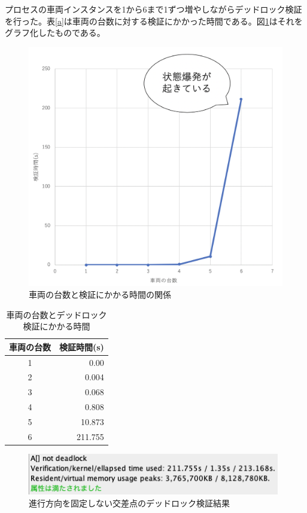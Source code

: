\documentclass{tpu-sotu}
\begin{document}
	プロセスの車両インスタンスを1から6まで1ずつ増やしながらデッドロック検証を行った。表\ref{a}は車両の台数に対する検証にかかった時間である。図\ref{IVT}はそれをグラフ化したものである。
	\begin{figure}[htbp]
	\centering
	\includegraphics[width=120mm]{IntersectionVerificationTime.png}
	\caption{車両の台数と検証にかかる時間の関係}
	\label{IVT}
	\end{figure}
	\begin{table}[htb]
	\centering
	\caption{車両の台数とデッドロック検証にかかる時間}
	\label{a}
	 \begin{tabular}{|c|r|} \hline
	    車両の台数 & 検証時間(s)  \\ \hline
	   1& 0.00  \\ \hline
	   2 & 0.004 \\ \hline
	   3 & 0.068 \\ \hline
	   4 & 0.808 \\ \hline
	   5 & 10.873 \\ \hline
	   6 & 211.755\\ \hline
	 \end{tabular}
	 \label{testcase}
	\end{table}

	\begin{figure}[htbp]
	\centering
	\includegraphics[width=110mm]{InterBigCar6.png}
	\caption{進行方向を固定しない交差点のデッドロック検証結果}
	\label{IBC6}
	\end{figure}
\end{document}
